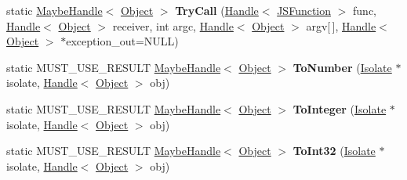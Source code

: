 \begin{DoxyCompactItemize}
\item 
\hypertarget{classv8_1_1internal_1_1_v8___f_i_n_a_l_a93a200156db86aa5304e9b47d2571a94}{}static \hyperlink{classv8_1_1internal_1_1_maybe_handle}{Maybe\+Handle}$<$ \hyperlink{classv8_1_1internal_1_1_object}{Object} $>$ {\bfseries Try\+Call} (\hyperlink{classv8_1_1internal_1_1_handle}{Handle}$<$ \hyperlink{classv8_1_1internal_1_1_j_s_function}{J\+S\+Function} $>$ func, \hyperlink{classv8_1_1internal_1_1_handle}{Handle}$<$ \hyperlink{classv8_1_1internal_1_1_object}{Object} $>$ receiver, int argc, \hyperlink{classv8_1_1internal_1_1_handle}{Handle}$<$ \hyperlink{classv8_1_1internal_1_1_object}{Object} $>$ argv\mbox{[}$\,$\mbox{]}, \hyperlink{classv8_1_1internal_1_1_handle}{Handle}$<$ \hyperlink{classv8_1_1internal_1_1_object}{Object} $>$ $\ast$exception\+\_\+out=N\+U\+L\+L)\label{classv8_1_1internal_1_1_v8___f_i_n_a_l_a93a200156db86aa5304e9b47d2571a94}

\item 
\hypertarget{classv8_1_1internal_1_1_v8___f_i_n_a_l_a3a966cb007ef075f284816e3298ff9b9}{}static M\+U\+S\+T\+\_\+\+U\+S\+E\+\_\+\+R\+E\+S\+U\+L\+T \hyperlink{classv8_1_1internal_1_1_maybe_handle}{Maybe\+Handle}$<$ \hyperlink{classv8_1_1internal_1_1_object}{Object} $>$ {\bfseries To\+Number} (\hyperlink{classv8_1_1internal_1_1_isolate}{Isolate} $\ast$isolate, \hyperlink{classv8_1_1internal_1_1_handle}{Handle}$<$ \hyperlink{classv8_1_1internal_1_1_object}{Object} $>$ obj)\label{classv8_1_1internal_1_1_v8___f_i_n_a_l_a3a966cb007ef075f284816e3298ff9b9}

\item 
\hypertarget{classv8_1_1internal_1_1_v8___f_i_n_a_l_a2b9c3fa585ba691c6fe4d8bd2f2985a5}{}static M\+U\+S\+T\+\_\+\+U\+S\+E\+\_\+\+R\+E\+S\+U\+L\+T \hyperlink{classv8_1_1internal_1_1_maybe_handle}{Maybe\+Handle}$<$ \hyperlink{classv8_1_1internal_1_1_object}{Object} $>$ {\bfseries To\+Integer} (\hyperlink{classv8_1_1internal_1_1_isolate}{Isolate} $\ast$isolate, \hyperlink{classv8_1_1internal_1_1_handle}{Handle}$<$ \hyperlink{classv8_1_1internal_1_1_object}{Object} $>$ obj)\label{classv8_1_1internal_1_1_v8___f_i_n_a_l_a2b9c3fa585ba691c6fe4d8bd2f2985a5}

\item 
\hypertarget{classv8_1_1internal_1_1_v8___f_i_n_a_l_aefdf6efd050f730a55ff15349db6cf8e}{}static M\+U\+S\+T\+\_\+\+U\+S\+E\+\_\+\+R\+E\+S\+U\+L\+T \hyperlink{classv8_1_1internal_1_1_maybe_handle}{Maybe\+Handle}$<$ \hyperlink{classv8_1_1internal_1_1_object}{Object} $>$ {\bfseries To\+Int32} (\hyperlink{classv8_1_1internal_1_1_isolate}{Isolate} $\ast$isolate, \hyperlink{classv8_1_1internal_1_1_handle}{Handle}$<$ \hyperlink{classv8_1_1internal_1_1_object}{Object} $>$ obj)\label{classv8_1_1internal_1_1_v8___f_i_n_a_l_aefdf6efd050f730a55ff15349db6cf8e}


\end{DoxyCompactItemize}
